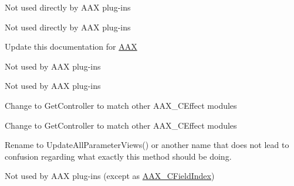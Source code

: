 
\begin{DoxyRefList}
\item[Member \mbox{\hyperlink{a00410_a901605fce9f6c52b770f95916a5db4cf}{AAX\+\_\+\+CAudio\+In\+Port}} ]\label{a00878__todo000008}%
%
Not used directly by AAX plug-\/ins  
\item[Member \mbox{\hyperlink{a00410_a650727644637144afc13344e7996c947}{AAX\+\_\+\+CAudio\+Out\+Port}} ]\label{a00878__todo000009}%
%
Not used directly by AAX plug-\/ins  
\item[Class \mbox{\hyperlink{a01832}{AAX\+\_\+\+CChunk\+Data\+Parser}} ]\label{a00878__todo000011}%
%
Update this documentation for \mbox{\hyperlink{a00950}{AAX}} 
\item[Member \mbox{\hyperlink{a00410_a7e697acf597bd7024de6bb13b9845ce7}{AAX\+\_\+\+CComponent\+ID}} ]\label{a00878__todo000006}%
%
Not used by AAX plug-\/ins  
\item[Member \mbox{\hyperlink{a00410_a9a9a14ab1486fa8c6734b96976be3056}{AAX\+\_\+\+CCount}} ]\label{a00878__todo000004}%
%
Not used by AAX plug-\/ins  
\item[Member \mbox{\hyperlink{a01844_a33ddee1a300bb3f2584fa224975d362b}{AAX\+\_\+\+CEffect\+Direct\+Data\+::Controller}} (void)]\label{a00878__todo000012}%
%
Change to Get\+Controller to match other AAX\+\_\+\+CEffect modules  
\item[Member \mbox{\hyperlink{a01844_a774a00f86f4851001f735f161187b05f}{AAX\+\_\+\+CEffect\+Direct\+Data\+::Effect\+Parameters}} (void)]\label{a00878__todo000013}%
%
Change to Get\+Controller to match other AAX\+\_\+\+CEffect modules  
\item[Member \mbox{\hyperlink{a01848_a172074a301ac9c771443b4b63a5b426b}{AAX\+\_\+\+CEffect\+GUI\+::Update\+All\+Parameters}} (void)]\label{a00878__todo000014}%
%
Rename to {\ttfamily Update\+All\+Parameter\+Views()} or another name that does not lead to confusion regarding what exactly this method should be doing.  
\item[Member \mbox{\hyperlink{a00410_a24ac375fa55ccadbc3126e6d81146c28}{AAX\+\_\+\+CIndex}} ]\label{a00878__todo000003}%
%
Not used by AAX plug-\/ins (except as \mbox{\hyperlink{a00410_ae807f8986143820cfb5d6da32165c9c7}{AAX\+\_\+\+CField\+Index}})  
\item[Member \mbox{\hyperlink{a00410_a6d976263b5f3dd5d01a89d65a3b98ded}{AAX\+\_\+\+CMeter\+ID}} ]\label{a00878__todo000007}%

\end{DoxyRefList}
